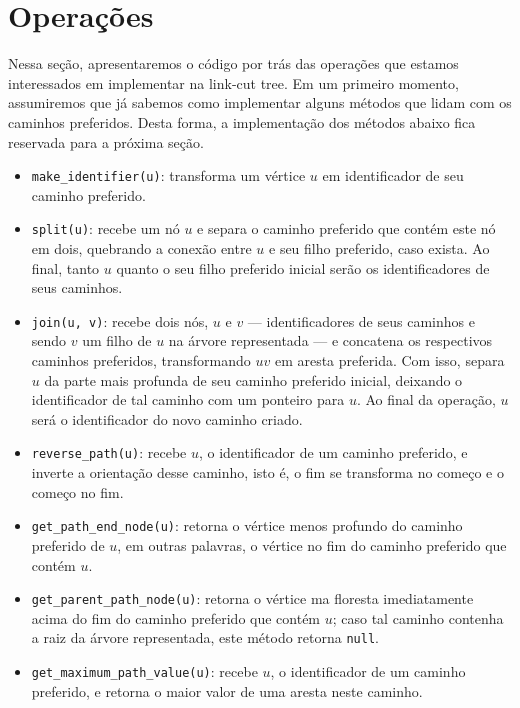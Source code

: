 \section{Operações}
\label{sec:lct-operacoes}

Nessa seção, apresentaremos o código por trás das operações que estamos interessados em implementar na link-cut tree. Em um primeiro momento, assumiremos que já sabemos como implementar alguns métodos que lidam com os caminhos preferidos. Desta forma, a implementação dos métodos abaixo fica reservada para a próxima seção.

\begin{itemize}
    \item \texttt{make\_identifier(u)}: transforma um vértice $u$ em identificador de seu caminho preferido.
    \item \texttt{split(u)}: recebe um nó $u$ e separa o caminho preferido que contém este nó em dois, quebrando a conexão entre $u$ e seu filho preferido, caso exista. Ao final, tanto $u$ quanto o seu filho preferido inicial serão os identificadores de seus caminhos.
    \item \texttt{join(u, v)}: recebe dois nós, $u$ e $v$ --- identificadores de seus caminhos e sendo $v$ um filho de $u$ na árvore representada --- e concatena os respectivos caminhos preferidos, transformando $uv$ em aresta preferida. Com isso, separa $u$ da parte mais profunda de seu caminho preferido inicial, deixando o identificador de tal caminho com um ponteiro para $u$. Ao final da operação, $u$ será o identificador do novo caminho criado.
    \item \texttt{reverse\_path(u)}: recebe $u$, o identificador de um caminho preferido, e inverte a orientação desse caminho, isto é, o fim se transforma no começo e o começo no fim.
    \item \texttt{get\_path\_end\_node(u)}: retorna o vértice menos profundo do caminho preferido de $u$, em outras palavras, o vértice no fim do caminho preferido que contém $u$.
    \item \texttt{get\_parent\_path\_node(u)}: retorna o vértice ma floresta imediatamente acima do fim do caminho preferido que contém $u$; caso tal caminho contenha a raiz da árvore representada, este método retorna \texttt{null}.
    \item \texttt{get\_maximum\_path\_value(u)}:  recebe $u$, o identificador de um caminho preferido, e retorna o maior valor de uma aresta neste caminho.
\end{itemize}

